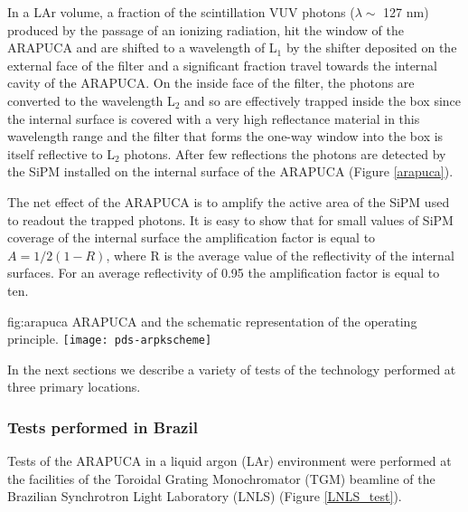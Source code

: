 In a LAr volume, a fraction of the scintillation VUV photons ($\lambda \sim$ 127 nm) produced by the passage of an ionizing radiation, hit the window of the ARAPUCA and are shifted to a wavelength of L$_1$ by the shifter deposited on the external face of the filter and a significant fraction travel towards the internal cavity of the ARAPUCA. On the inside face of the filter, the photons are converted to the wavelength L$_2$ and so are effectively trapped inside the box since the internal surface is covered with a very high reflectance material in this wavelength range and the filter that forms the one-way window into  the box is itself reflective to L$_2$ photons.  After few reflections the photons are detected by the SiPM installed on the internal surface of the ARAPUCA (Figure \ref{arapuca}). 

The net effect of the ARAPUCA is to amplify the active area of the SiPM used to readout the trapped photons. It is easy to show that for small values of SiPM coverage of the internal surface the amplification factor is equal to $A=1/2(1-R)$,
where R is the average value of the reflectivity of the internal surfaces. For an average reflectivity of 0.95 the amplification factor is equal to ten.

\begin{dunefigure}{fig:arapuca}
{ARAPUCA and the schematic representation of the operating principle.}
  \texttt{[image: pds-arpkscheme]}   
\end{dunefigure}

In the next sections we describe a variety of tests of the technology performed at three primary locations.

\subsubsection{Tests performed in Brazil}
\label{subsec:testlnls}

Tests of the ARAPUCA in a liquid argon (LAr) environment were performed at the facilities of the Toroidal Grating Monochromator (TGM) beamline of the Brazilian Synchrotron Light Laboratory (LNLS) (Figure \ref{LNLS_test}). 

